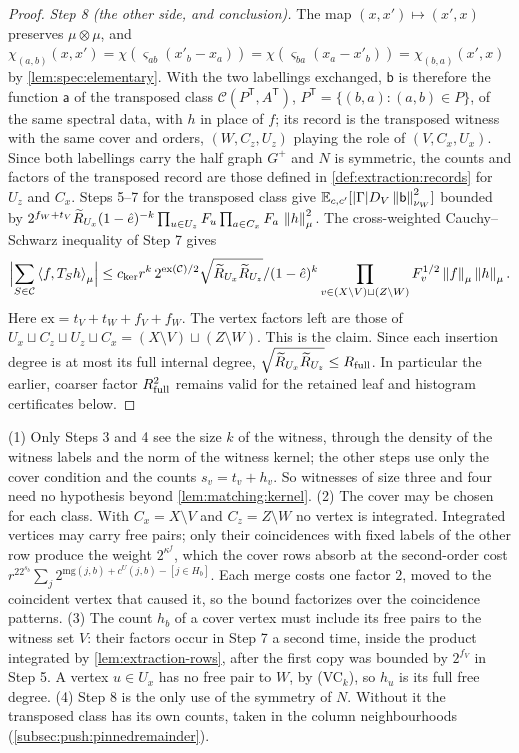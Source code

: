\begin{proof}
\emph{Step 8 (the other side, and conclusion).} The map $(x,x')\mapsto(x',x)$
preserves $\mu\otimes\mu$, and
$\chi_{(a,b)}(x,x')=\chi(\varsigma_{ab}(x'_b-x_a))=\chi(\varsigma_{ba}(x_a-x'_b))
=\chi_{(b,a)}(x',x)$ by \cref{lem:spec:elementary}. With the two labellings
exchanged, $\mathsf b$ is therefore the function $\mathsf a$ of the transposed class
$\mathcal C(P^{\mathsf T},A^{\mathsf T})$, $P^{\mathsf T}=\{(b,a):(a,b)\in P\}$, of the
same spectral data, with $h$ in place of $f$; its record is the transposed
witness with the same cover and orders, $(W,C_z,U_z)$ playing the role of
$(V,C_x,U_x)$. Since both labellings carry the half graph $G^+$ and $N$ is
symmetric, the counts and factors of the transposed record are those defined in
\cref{def:extraction:records} for $U_z$ and $C_x$. Steps 5--7 for the transposed
class give
$\mathbb E_{c,c'}[|\Gamma|D_V\left\|\mathsf b\right\|^2_{\nu_W}]$ bounded by
$2^{f_W+t_V}\widetilde R_{U_x}(1-\hat e)^{-k}
\prod_{u\in U_z}F_u\prod_{a\in C_x}F_a\,\left\|h\right\|_\mu^2$.
The cross-weighted Cauchy--Schwarz inequality of Step 7 gives
\[
 \Bigl|\sum_{S\in\mathcal C}\left\langle f,T_Sh\right\rangle_\mu\Bigr|
 \le c_{\rm ker}r^k\,2^{\mathrm{ex}(\mathcal C)/2}
 \sqrt{\widetilde R_{U_x}\widetilde R_{U_z}}/(1-\hat e)^k
 \prod_{v\in(X\setminus V)\sqcup(Z\setminus W)}F_v^{1/2}
 \left\|f\right\|_\mu\left\|h\right\|_\mu .
\]
Here $\mathrm{ex}=t_V+t_W+f_V+f_W$. The vertex factors left are those of
$U_x\sqcup C_z\sqcup U_z\sqcup C_x=(X\setminus V)\sqcup(Z\setminus W)$. This is the
claim. Since each insertion degree is at most its full internal degree,
$\sqrt{\widetilde R_{U_x}\widetilde R_{U_z}}\le R_{\rm full}$.
In particular the earlier, coarser factor $R_{\rm full}^2$ remains valid
for the retained leaf and histogram certificates below.
\end{proof}

\begin{remark}\label{rem:extraction-proof}
(1) Only Steps 3 and 4 see the size $k$ of the witness, through the density of the
witness labels and the norm of the witness kernel; the other steps use only the
cover condition and the counts $s_v=t_v+h_v$. So witnesses of size three and four
need no hypothesis beyond \cref{lem:matching:kernel}.
(2) The cover may be chosen for each class. With $C_x=X\setminus V$ and
$C_z=Z\setminus W$ no vertex is integrated. Integrated vertices may carry free
pairs; only their coincidences with fixed labels of the other row produce the weight
$2^{\kappa^f}$, which the cover rows absorb at the second-order cost
$r^22^{s_b}\sum_j2^{\mathrm{mg}(j,b)+c^U(j,b)-[j\in H_b]}$. Each merge costs one factor $2$,
moved to the coincident vertex that caused it, so the bound factorizes over the
coincidence patterns.
(3) The count $h_b$ of a cover vertex must include its free pairs to the witness set
$V$: their factors occur in Step 7 a second time, inside the product integrated by
\cref{lem:extraction-rows}, after the first copy was bounded by $2^{f_V}$ in Step 5.
A vertex $u\in U_x$ has no free pair to $W$, by (VC$_k$), so $h_u$ is its full free
degree.
(4) Step 8 is the only use of the symmetry of $N$. Without it the transposed class
has its own counts, taken in the column neighbourhoods
(\cref{subsec:push:pinnedremainder}).
\end{remark}

